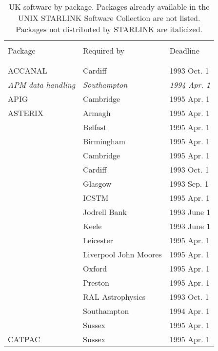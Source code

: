 \begin{table}
\caption{UK software by package.
Packages already available in the UNIX STARLINK Software Collection
are not listed.
Packages not distributed by STARLINK are italicized.}
\vspace{5mm}
\begin{center}
\begin{tabular}{|p{36mm}|p{50mm}|p{30mm}|} \hline \label{t_UKpack}
& & \\
Package & Required by & Deadline \\
& & \\ \hline
& & \\
ACCANAL                 & Cardiff          & 1993 Oct. 1 \\
{\em APM data handling} & {\em Southampton} & {\em 1994 Apr. 1} \\
APIG                    & Cambridge        & 1995 Apr. 1 \\
ASTERIX                 & Armagh           & 1995 Apr. 1 \\
                        & Belfast          & 1995 Apr. 1 \\
                        & Birmingham       & 1995 Apr. 1 \\
                        & Cambridge        & 1995 Apr. 1 \\
                        & Cardiff          & 1993 Oct. 1 \\
                        & Glasgow          & 1993 Sep. 1 \\
                        & ICSTM            & 1995 Apr. 1 \\
                        & Jodrell Bank     & 1993 June 1 \\
                        & Keele            & 1993 June 1 \\
                        & Leicester        & 1995 Apr. 1 \\
                        & Liverpool John Moores & 1995 Apr. 1 \\
                        & Oxford           & 1995 Apr. 1 \\
                        & Preston          & 1995 Apr. 1 \\
                        & RAL Astrophysics & 1993 Oct. 1 \\
                        & Southampton      & 1994 Apr. 1 \\
                        & Sussex           & 1995 Apr. 1 \\
CATPAC                  & Sussex           & 1995 Apr. 1 \\

\end{tabular}
\end{center}
\end{table}
